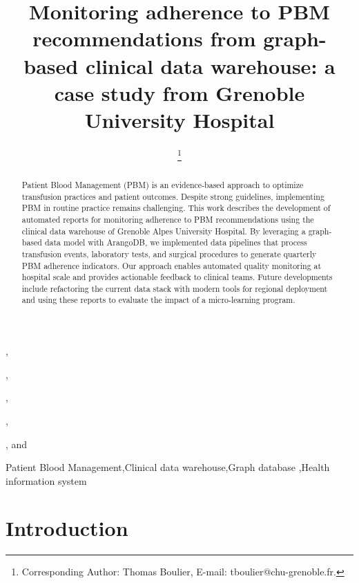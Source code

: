 \documentclass{IOS-Book-Article}
\def\hb{\hbox to 11.5 cm{}}
\begin{document}
\pagestyle{headings}
\def\thepage{}
\begin{frontmatter}

\title{Monitoring adherence to PBM recommendations from graph-based clinical data warehouse: a case study from Grenoble University Hospital}

\markboth{}{October 2025\hb}

\author[A]{ },
\author[A]{ },
\author[A]{ },
\author[A]{ },
\author[A]{ %
\thanks{Corresponding Author: Thomas Boulier, E-mail: tboulier@chu-grenoble.fr.}}, 
and
\author[A]{ }

\address[A]{Univ. Grenoble Alpes, CNRS, UMR 5525, VetAgro Sup, Grenoble INP, CHU Grenoble Alpes, TIMC, 38000 Grenoble, France}

\begin{abstract}
Patient Blood Management (PBM) is an evidence-based approach to optimize transfusion 
practices and patient outcomes. Despite strong guidelines, implementing PBM in routine 
practice remains challenging. This work describes the development of 
automated reports for monitoring adherence to PBM recommendations using the 
clinical data warehouse of Grenoble Alpes University Hospital. 
By leveraging a graph-based data model with ArangoDB, we implemented data pipelines
that process transfusion events, laboratory tests, and surgical procedures to generate 
quarterly PBM adherence indicators. Our approach enables automated quality monitoring 
at hospital scale and provides actionable feedback to clinical teams. Future 
developments include refactoring the current data stack with modern tools for regional
deployment and using these reports to evaluate the impact of a micro-learning program.
\end{abstract}

\begin{keyword}
Patient Blood Management\sep Clinical data warehouse\sep Graph database \sep Health information system
\end{keyword}
\end{frontmatter}

\markboth{October 2025\hb}{October 2025\hb}

\section{Introduction}
\end{document}
